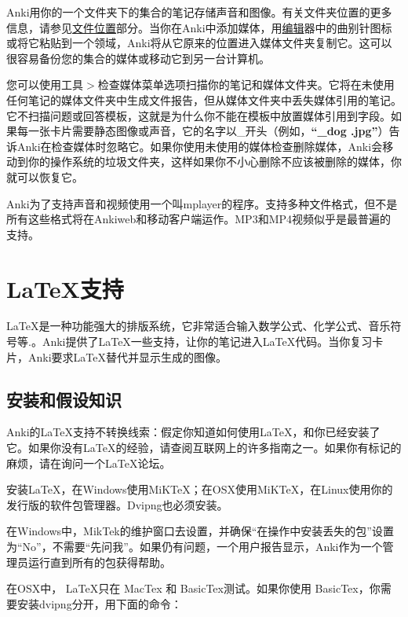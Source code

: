 \documentclass[a4paper]{book}
\begin{document}
		Anki用你的一个文件夹下的集合的笔记存储声音和图像。有关文件夹位置的更多信息，请参见\hyperref[files]{文件位置}部分。当你在Anki中添加媒体，用\hyperref[editor]{编辑}器中的曲别针图标或将它粘贴到一个领域，Anki将从它原来的位置进入媒体文件夹复制它。这可以很容易备份您的集合的媒体或移动它到另一台计算机。
		
		您可以使用工具$>$检查媒体菜单选项扫描你的笔记和媒体文件夹。它将在未使用任何笔记的媒体文件夹中生成文件报告，但从媒体文件夹中丢失媒体引用的笔记。它不扫描问题或回答模板，这就是为什么你不能在模板中放置媒体引用到字段。如果每一张卡片需要静态图像或声音，它的名字以\_开头（例如，\textbf{“\_dog .jpg”}）告诉Anki在检查媒体时忽略它。如果你使用未使用的媒体检查删除媒体，Anki会移动到你的操作系统的垃圾文件夹，这样如果你不小心删除不应该被删除的媒体，你就可以恢复它。
		
		Anki为了支持声音和视频使用一个叫mplayer的程序。支持多种文件格式，但不是所有这些格式将在Ankiweb和移动客户端运作。MP3和MP4视频似乎是最普遍的支持。
		
		\chapter{\LaTeX{}{}支持}
		
		\LaTeX{}是一种功能强大的排版系统，它非常适合输入数学公式、化学公式、音乐符号等.。Anki提供了\LaTeX{}一些支持，让你的笔记进入\LaTeX{}代码。当你复习卡片，Anki要求\LaTeX{}替代并显示生成的图像。
		
		\section{安装和假设知识}
		
		Anki的\LaTeX{}支持不转换线索：假定你知道如何使用\LaTeX{}，和你已经安装了它。如果你没有\LaTeX{}的经验，请查阅互联网上的许多指南之一。如果你有标记的麻烦，请在询问一个\LaTeX{}论坛。
		
		安装\LaTeX{}，在Windows使用MiKTeX；在OSX使用MiKTeX，在Linux使用你的发行版的软件包管理器。Dvipng也必须安装。
		
		
		\begin{shaded}
			在Windows中，MikTek的维护窗口去设置，并确保“在操作中安装丢失的包”设置为“No”，不需要“先问我”。如果仍有问题，一个用户报告显示，Anki作为一个管理员运行直到所有的包获得帮助。
		\end{shaded}
		
		\begin{shaded}
			在OSX中， \LaTeX{}只在 MacTex 和 BasicTex测试。如果你使用 BasicTex，你需要安装dvipng分开，用下面的命令：
		\end{shaded}
		
\end{document}

